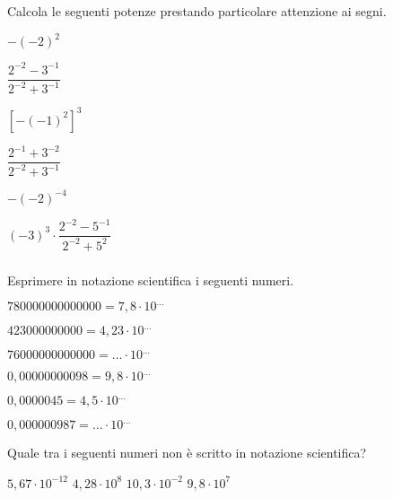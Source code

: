 \begin{esercizio}
 \label{ese:3.60}
Calcola le seguenti potenze prestando particolare attenzione ai segni.

\begin{htmulticols}{3}
\begin{enumeratees}
 \spazielenx
 \item \(-(-2)^2\)
 \item \(\dfrac{2^{-2}-3^{-1}}{2^{-2}+3^{-1}}\)
 \item \([-(-1)^{2}]^3\)
 \item \(\dfrac{2^{-1}+3^{-2}}{2^{-2}+3^{-1}}\)
 \item \(-(-2)^{-4}\)
 \item \((-3)^3\cdot\dfrac{2^{-2}-5^{-1}}{2^{-2}+5^2}\)
\end{enumeratees}
\end{htmulticols}
\end{esercizio}

\subsubsection*{}

\begin{esercizio}
 \label{ese:3.61}
Esprimere in notazione scientifica i seguenti numeri.

\begin{htmulticols}{2}
\begin{enumeratees}
\item \(780000000000000=7,8\cdot10^{\ldots}\)
\item \(423000000000=4,23\cdot10^{\ldots}\)
\item \(76000000000000= \ldots \cdot 10^{\ldots}\)
\item \(0,00000000098=9,8\cdot10^{\ldots}\)
\item \(0,0000045=4,5\cdot10^{\ldots}\)
\item \(0,000000987= \ldots \cdot 10^{\ldots}\)
\end{enumeratees}
\end{htmulticols}
\end{esercizio}

\begin{esercizio}
 \label{ese:3.62}
Quale tra i seguenti numeri non è scritto in notazione scientifica?

\quad\(5,67\cdot 10^{-12}\)\qquad
{}\quad\(4,28\cdot 10^8\)\qquad
{}\quad\(10,3\cdot 10^{-2}\)\qquad
{}\quad\(9,8\cdot 10^7\)\qquad
\end{esercizio}


